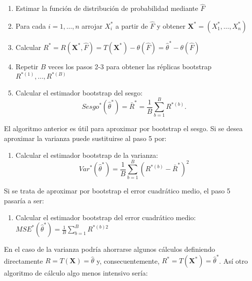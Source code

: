 \documentclass[
]{book}
\providecommand{\tightlist}{%
  \setlength{\itemsep}{0pt}\setlength{\parskip}{0pt}}
\renewcommand{\mathbf}[1]{\symbf{#1}}
\theoremstyle{break}
\theoremstyle{nonumberplain}
\begin{document}
\begin{enumerate}
\def\labelenumi{\arabic{enumi}.}
\item
  Estimar la función de distribución de probabilidad mediante \(\hat{F}\)
\item
  Para cada \(i=1,\ldots ,n\) arrojar \(X_i^{\ast}\) a partir de
  \(\hat{F}\) y obtener
  \(\mathbf{X}^{\ast}=\left( X_1^{\ast}, \ldots ,X_n^{\ast} \right)\)
\item
  Calcular \(R^{\ast}=R\left( \mathbf{X}^{\ast},\hat{F} \right)
  =T\left( \mathbf{X}^{\ast} \right) -\theta \left( \hat{F} \right) =
  \hat{\theta}^{\ast}- \theta \left( \hat{F} \right)\)
\item
  Repetir \(B\) veces los pasos 2-3 para obtener las réplicas bootstrap
  \(R^{\ast (1)}, \ldots, R^{\ast (B)}\)
\item
  Calcular el estimador bootstrap del sesgo:
  \[Sesgo^{\ast}\left( \hat{\theta}^{\ast} \right) =\bar{R}^{\ast}=\frac{1
  }{B}\sum_{b=1}^{B}R^{\ast (b)}.\]
\end{enumerate}

El algoritmo anterior es útil para aproximar por bootstrap el sesgo. Si
se desea aproximar la varianza puede sustituirse al paso 5 por:

\begin{enumerate}
\def\labelenumi{\arabic{enumi}.}
\setcounter{enumi}{4}
\tightlist
\item
  Calcular el estimador bootstrap de la varianza:
  \[Var^{\ast}\left( \hat{\theta}^{\ast} \right) =\frac{1}{B}
  \sum_{b=1}^{B}\left( R^{\ast (b)}-\bar{R}^{\ast} \right)^2\]
\end{enumerate}

Si se trata de aproximar por bootstrap el error cuadrático medio, el
paso 5 pasaría a ser:

\begin{enumerate}
\def\labelenumi{\arabic{enumi}.}
\setcounter{enumi}{4}
\tightlist
\item
  Calcular el estimador bootstrap del error cuadrático medio:
  \(MSE^{\ast}\left( \hat{\theta}^{\ast} \right) =\frac{1}{B}\sum_{b=1}^{B}R^{\ast (b) 2}\)
\end{enumerate}

En el caso de la varianza podría ahorrarse algunos cálculos definiendo
directamente \(R=T\left( \mathbf{X} \right) =\hat{\theta}\) y,
consecuentemente,
\(R^{\ast}=T\left( \mathbf{X}^{\ast} \right) =
\hat{\theta}^{\ast}\). Así otro algoritmo de cálculo algo menos
intensivo sería:
\end{document}

